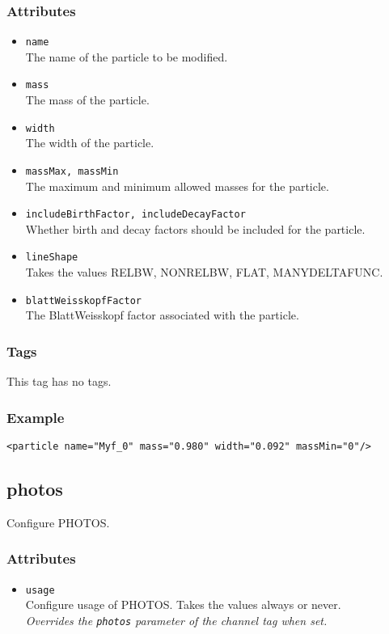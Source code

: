 \subsubsection*{Attributes}
\begin{itemize}
\item{\tt name}\\
      The name of the particle to be modified.
\item{\tt mass}\\
      The mass of the particle.
\item{\tt width}\\
      The width of the particle.
\item{\tt massMax, massMin}\\
      The maximum and minimum allowed masses for the particle.
\item{\tt includeBirthFactor, includeDecayFactor}\\
      Whether birth and decay factors should be included for the particle.
\item{\tt lineShape}\\
      Takes the values RELBW, NONRELBW, FLAT, MANYDELTAFUNC.
\item{\tt blattWeisskopfFactor}\\
      The BlattWeisskopf factor associated with the particle.
\end{itemize}
\subsubsection*{Tags}
This tag has no tags.
\subsubsection*{Example}
{\footnotesize
\begin{verbatim}
<particle name="Myf_0" mass="0.980" width="0.092" massMin="0"/>
\end{verbatim}
}

\subsection{photos}
Configure PHOTOS.
\subsubsection*{Attributes}
\begin{itemize}
\item{\tt usage}\\
      Configure usage of PHOTOS. Takes the values always or never.\\
      \emph{Overrides the {\tt photos} parameter of the channel tag when set.}
\end{itemize}
